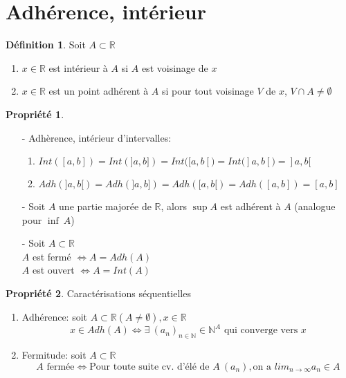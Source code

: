 \documentclass[fleqn]{article}
\theoremstyle{definition} \newtheorem*{defi}{D\'efinition}
\theoremstyle{definition} \newtheorem*{theo}{Th\'eor\`eme}
\theoremstyle{definition} \newtheorem*{adh}{Caract\'erisation s\'equentielle de l'adh\'erence}
\theoremstyle{definition} \newtheorem*{prop}{Propri\'et\'e}
\theoremstyle{definition} \newtheorem*{fermitude}{Caract\'erisation s\'equentielle de la fermitude}
\begin{document}
\section{Adh\'erence, int\'erieur}
\begin{defi}
	Soit $A \subset \mathbb{R}$
	\begin{enumerate}
		\item $x \in \mathbb{R}$ est int\'erieur \`a $A$ si $A$ est voisinage de $x$
		\item $x \in \mathbb{R}$ est un point adh\'erent \`a $A$ si pour tout voisinage $V$ de $x$, $V \cap A \neq \emptyset$
	\end{enumerate}
\end{defi}

\begin{prop} $ $
	\begin{enumerate}
		\item [-] Adh\`erence, int\'erieur d'intervalles:
			\begin{enumerate}
				\item $Int([a,b]) = Int(]a,b])= Int([a,b[)= Int(]a,b[) = ]a,b[$
				\item $Adh(]a,b[)= Adh(]a,b])= Adh([a,b[)= Adh([a,b]) = [a,b]$
			\end{enumerate}
		\item [-] Soit $A$ une partie major\'ee de $\mathbb{R}$, alors $\sup A$ est adh\'erent \`a $A$ (analogue pour $\inf\ A$)
		\item [-] Soit $A \subset \mathbb{R}$ \\
			$A$ est ferm\'e $\Leftrightarrow A = Adh(A)$ \\
			$A$ est ouvert $\Leftrightarrow A = Int(A)$
	\end{enumerate}
\end{prop}
\begin{prop} Caract\'erisations s\'equentielles
	\begin{enumerate}
		\item Adh\'erence: soit $A \subset \mathbb{R} (A \neq \emptyset), x \in \mathbb{R}$
			\[x \in Adh(A) \Leftrightarrow \exists\ (a_n)_{n \in \mathbb{N}} \in \mathbb{N}^A \text{ qui converge vers } x\]
		\item Fermitude: soit $A \subset \mathbb{R}$
			\[A \text{ ferm\'ee} \Leftrightarrow \text{Pour toute suite cv. d'\'el\'e de } A\ (a_n), \text{on a } lim_{n \to \infty} a_n \in A\]
	\end{enumerate}
\end{prop}
\end{document}
